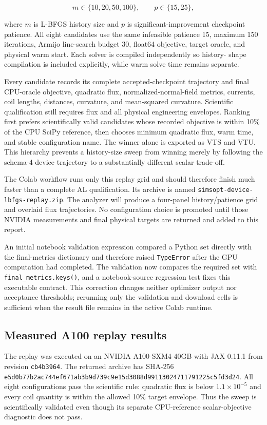 \documentclass[11pt,a4paper]{article}
\newcommand{\code}[1]{\texttt{#1}}
\begin{document}
\[
  m\in\{10,20,50,100\},\qquad
  p\in\{15,25\},
\]

where $m$ is L-BFGS history size and $p$ is significant-improvement checkpoint
patience.  All eight candidates use the same infeasible patience 15, maximum
150 iterations, Armijo line-search budget 30, float64 objective, target oracle,
and physical warm start.  Each solver is compiled independently so history-
shape compilation is included explicitly, while warm solve time remains
separate.

Every candidate records its complete accepted-checkpoint trajectory and final
CPU-oracle objective, quadratic flux, normalized-normal-field metrics, currents,
coil lengths, distances, curvature, and mean-squared curvature.  Scientific
qualification still requires flux and all physical engineering envelopes.
Ranking first prefers scientifically valid candidates whose recorded objective
is within 10\% of the CPU SciPy reference, then chooses minimum quadratic flux,
warm time, and stable configuration name.  The winner alone is exported as VTS
and VTU.  This hierarchy prevents a history-size sweep from winning merely by
following the schema-4 device trajectory to a substantially different scalar
trade-off.

The Colab workflow runs only this replay grid and should therefore finish much
faster than a complete AL qualification.  Its archive is named
\code{simsopt-device-lbfgs-replay.zip}.  The analyzer will produce a four-panel
history/patience grid and overlaid flux trajectories.  No configuration choice
is promoted until those NVIDIA measurements and final physical targets are
returned and added to this report.

An initial notebook validation expression compared a Python set directly with
the final-metrics dictionary and therefore raised \code{TypeError} after the
GPU computation had completed.  The validation now compares the required set
with \code{final\_metrics.keys()}, and a notebook-source regression test fixes
this executable contract.  This correction changes neither optimizer output
nor acceptance thresholds; rerunning only the validation and download cells is
sufficient when the result file remains in the active Colab runtime.

\subsection{Measured A100 replay results}

The replay was executed on an NVIDIA A100-SXM4-40GB with JAX 0.11.1 from
revision \code{cb4b3964}.  The returned archive has SHA-256
\code{e5d0b77b2ac744ef671ab3b9d739c9e15d3088d99113024711791225c5fd3d24}.
All eight configurations pass the scientific rule: quadratic flux is below
$1.1\times10^{-5}$ and every coil quantity is within the allowed 10\% target
envelope.  Thus the sweep is scientifically validated even though its separate
CPU-reference scalar-objective diagnostic does not pass.
\end{document}
